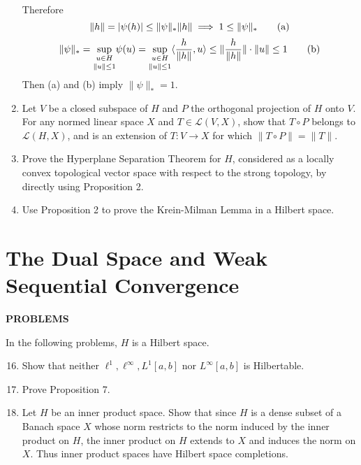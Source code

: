 \begin{enumerate}
\begin{itemize}
    \end{itemize}
    Therefore
    \[
        \|h\|=|\psi(h)|\le \|\psi\|_*\|h\|\implies 1\le \|\psi\|_*\tag{\text{a}}
    \]
    \[
        \|\psi\|_*=\underset{\|u\|\le1}{\underset{u\in H}{\sup}}\psi(u)=\underset{\|u\|\le1}{\underset{u\in H}{\sup}}\langle \frac{h}{\|h\|},u\rangle\le \|\frac{h}{\|h\|}\|\cdot\|u\|\le1\tag{\text{b}}
    \]
    Then (a) and (b) imply $\|\psi\|_*=1$.
    \item Let $V$ be a closed subspace of $H$ and $P$ the orthogonal projection of $H$ onto $V$.
    For any normed linear space $X$ and $T\in\mathcal{L}(V,X)$, show that $T\circ P$ belongs to $\mathcal{L}(H,X)$, and is an extension of $T:V\to X$ for which $\|T\circ P\|=\|T\|$.
    \item Prove the Hyperplane Separation Theorem for $H$, considered as a locally convex topological vector space with respect to the strong topology, by directly using Proposition 2.
    \item Use Proposition 2 to prove the Krein-Milman Lemma in a Hilbert space.
\end{enumerate}

\section{The Dual Space and Weak Sequential Convergence}
\begin{center}
	\textbf{PROBLEMS}
\end{center}
In the following problems, $H$ is a Hilbert space.
\begin{enumerate}
	\setcounter{enumi}{15}
    \item Show that neither $\ell^1,\ell^\infty,L^1[a,b]$ nor $L^\infty[a,b]$ is Hilbertable.
    \item Prove Proposition 7.
    \item Let $H$ be an inner product space. Show that since $H$ is a dense subset of a Banach space $X$ whose norm restricts to the norm induced by the inner product on $H$, the inner product on $H$ extends to $X$ and induces the norm on $X$.
    Thus inner product spaces have Hilbert space completions.
\end{enumerate}

